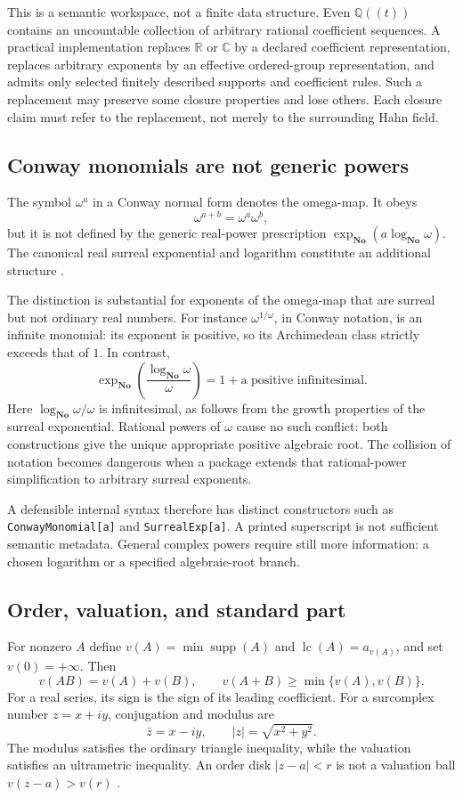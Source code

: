 \documentclass[11pt,letterpaper]{article}
\numberwithin{equation}{section}
\theoremstyle{definition}
\theoremstyle{remark}\newtheorem{remark}[theorem]{Remark}
\newcommand{\No}{\mathbf{No}}
\newcommand{\R}{\mathbb R}
\newcommand{\C}{\mathbb C}
\newcommand{\Q}{\mathbb Q}
\newcommand{\supp}{\operatorname{supp}}
\newcommand{\lc}{\operatorname{lc}}
\begin{document}
This is a semantic workspace, not a finite data structure. Even
$\Q((t))$ contains an uncountable collection of arbitrary rational coefficient
sequences. A practical implementation replaces $\R$ or $\C$ by a declared
coefficient representation, replaces arbitrary exponents by an effective
ordered-group representation, and admits only selected finitely described
supports and coefficient rules. Such a replacement may preserve some closure
properties and lose others. Each closure claim must refer to the replacement,
not merely to the surrounding Hahn field.

\subsection{Conway monomials are not generic powers}
\label{subsec:omega}
The symbol $\omega^a$ in a Conway normal form denotes the omega-map. It obeys
\[
 \omega^{a+b}=\omega^a\omega^b,
\]
but it is not defined by the generic real-power prescription
$\exp_{\No}(a\log_{\No}\omega)$. The canonical real surreal exponential and
logarithm constitute an additional structure \cite{Gonshor,vdDE}.

The distinction is substantial for exponents of the omega-map that are
surreal but not ordinary real numbers. For instance $\omega^{1/\omega}$, in Conway notation,
is an infinite monomial: its exponent is positive, so its Archimedean class
strictly exceeds that of $1$. In contrast,
\[
 \exp_{\No}\!\left(\frac{\log_{\No}\omega}{\omega}\right)
 =1+\text{a positive infinitesimal}.
\]
Here $\log_{\No}\omega/\omega$ is infinitesimal, as follows from the growth
properties of the surreal exponential. Rational powers of $\omega$ cause no
such conflict: both constructions give the unique appropriate positive
algebraic root. The collision of notation becomes dangerous when a package
extends that rational-power simplification to arbitrary surreal exponents.

A defensible internal syntax therefore has distinct constructors such as
\texttt{ConwayMonomial[a]} and \texttt{SurrealExp[a]}. A printed superscript is
not sufficient semantic metadata. General complex powers require still more
information: a chosen logarithm or a specified algebraic-root branch.

\subsection{Order, valuation, and standard part}
For nonzero $A$ define $v(A)=\min\supp(A)$ and
$\lc(A)=a_{v(A)}$, and set $v(0)=+\infty$. Then
\[
 v(AB)=v(A)+v(B),\qquad v(A+B)\ge\min\{v(A),v(B)\}.
\]
For a real series, its sign is the sign of its leading coefficient. For a
surcomplex number $z=x+iy$, conjugation and modulus are
\[
 \bar z=x-iy,\qquad |z|=\sqrt{x^2+y^2}.
\]
The modulus satisfies the ordinary triangle inequality, while the valuation
satisfies an ultrametric inequality. An order disk $|z-a|<r$ is not a
valuation ball $v(z-a)>v(r)$ \cite{SourcePolynomial}.
\end{document}
